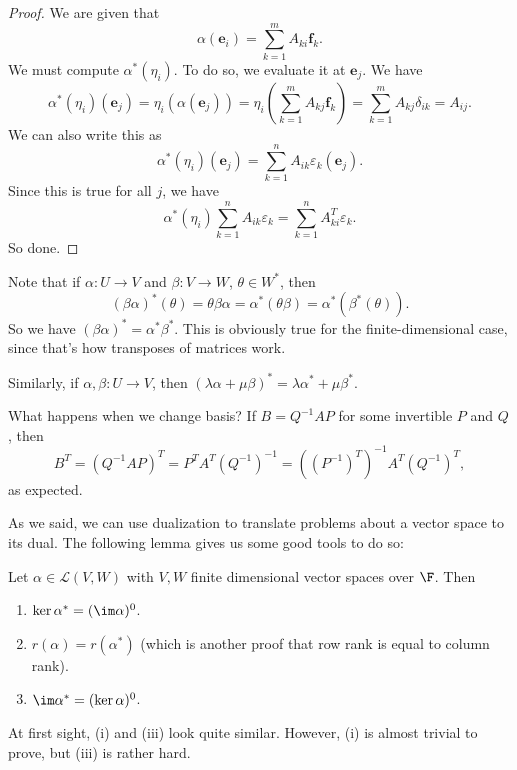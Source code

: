 \documentclass[a4paper]{article}
\begin{document}
\begin{proof}
  We are given that
  \[
    \alpha (\mathbf{e}_i) = \sum_{k = 1}^m A_{ki}\mathbf{f}_k.
  \]
  We must compute $\alpha^*(\eta_i)$. To do so, we evaluate it at $\mathbf{e}_j$. We have
  \[
    \alpha^*(\eta_i)(\mathbf{e}_j) = \eta_i(\alpha(\mathbf{e}_j)) = \eta_i\left(\sum_{k = 1}^m A_{kj}\mathbf{f}_k\right) = \sum_{k = 1}^m A_{kj} \delta_{ik} = A_{ij}.
  \]
  We can also write this as
  \[
    \alpha^*(\eta_i)(\mathbf{e}_j) = \sum_{k = 1}^n A_{ik} \varepsilon_k (\mathbf{e}_j).
  \]
  Since this is true for all $j$, we have
  \[
    \alpha^*(\eta_i) \sum_{k = 1}^n A_{ik}\varepsilon_k = \sum_{k = 1}^n A_{ki}^T \varepsilon_k.
  \]
  So done.
\end{proof}

Note that if $\alpha: U\to V$ and $\beta: V\to W$, $\theta \in W^*$, then
\[
  (\beta\alpha)^*(\theta) = \theta\beta\alpha = \alpha^*(\theta\beta) = \alpha^*(\beta^*(\theta)).
\]
So we have $(\beta\alpha)^* = \alpha^*\beta^*$. This is obviously true for the finite-dimensional case, since that's how transposes of matrices work.

Similarly, if $\alpha, \beta: U \to V$, then $(\lambda\alpha + \mu\beta)^* = \lambda\alpha^* + \mu\beta^*$.

What happens when we change basis? If $B = Q^{-1}AP$ for some invertible $P$ and $Q$, then
\[
  B^T = (Q^{-1}AP)^T = P^TA^T(Q^{-1})^{-1} = ((P^{-1})^T)^{-1} A^T (Q^{-1})^T,
\]
as expected.

As we said, we can use dualization to translate problems about a vector space to its dual. The following lemma gives us some good tools to do so:
\begin{lemma}
  Let $\alpha \in \mathcal{L}(V, W)$ with $V, W$ finite dimensional vector spaces over $\F$. Then
  \begin{enumerate}
    \item $\ker \alpha^* = (\im \alpha)^0$.
    \item $r(\alpha) = r(\alpha^*)$ (which is another proof that row rank is equal to column rank).
    \item $\im \alpha^* = (\ker \alpha)^0$.
  \end{enumerate}
\end{lemma}
At first sight, (i) and (iii) look quite similar. However, (i) is almost trivial to prove, but (iii) is rather hard.
\end{document}
